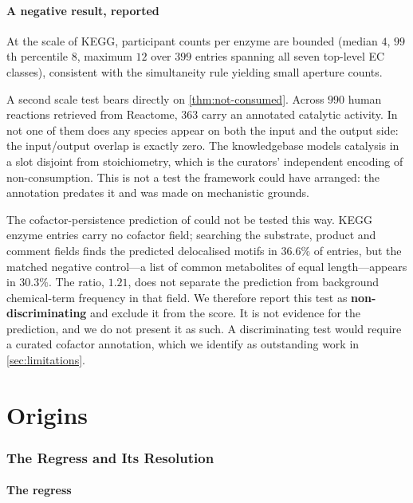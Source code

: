 \documentclass[11pt,twocolumn,a4paper]{article}
\theoremstyle{plain}
\theoremstyle{definition}
\theoremstyle{remark}
\begin{document}
\subsection{A negative result, reported}

At the scale of KEGG, participant counts per enzyme are bounded (median $4$,
$99$th percentile $8$, maximum $12$ over $399$ entries spanning all seven
top-level EC classes), consistent with the simultaneity rule yielding small
aperture counts.

A second scale test bears directly on \cref{thm:not-consumed}. Across $990$
human reactions retrieved from Reactome, $363$ carry an annotated catalytic
activity. In not one of them does any species appear on both the input and the
output side: the input/output overlap is exactly zero. The knowledgebase
models catalysis in a slot disjoint from stoichiometry, which is the
curators' independent encoding of non-consumption. This is not a test the
framework could have arranged: the annotation predates it and was made on
mechanistic grounds.

The cofactor-persistence prediction of \cref{part:origins} could not be tested
this way. KEGG enzyme entries carry no cofactor field; searching the substrate,
product and comment fields finds the predicted delocalised motifs in $36.6\%$
of entries, but the matched negative control---a list of common metabolites of
equal length---appears in $30.3\%$. The ratio, $1.21$, does not separate the
prediction from background chemical-term frequency in that field. We therefore
report this test as \textbf{non-discriminating} and exclude it from the score.
It is not evidence for the prediction, and we do not present it as such. A
discriminating test would require a curated cofactor annotation, which we
identify as outstanding work in \cref{sec:limitations}.

\part{Origins}
\label{part:origins}

\section{The Regress and Its Resolution}
\label{sec:origins}

\subsection{The regress}
\end{document}
